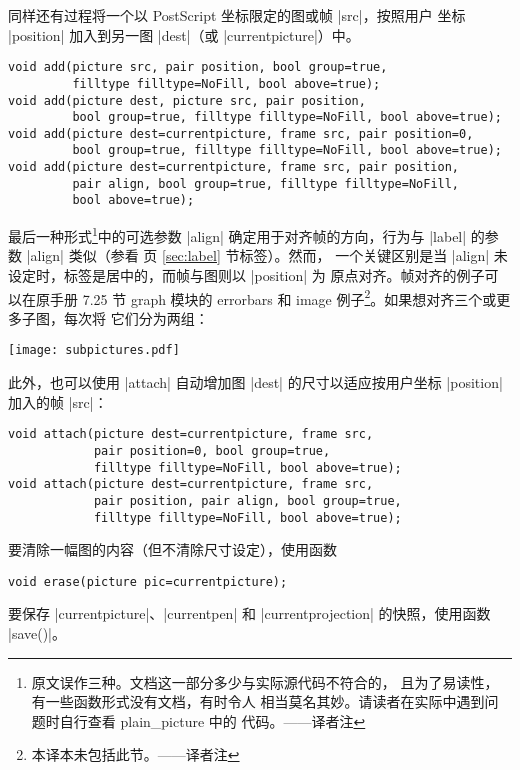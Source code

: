 \documentclass{ctexbook}
\makeatletter
\newenvironment{typelist}{\itemize
  \let\old@item\@item
  \def\@item[##1]{\expandafter\old@item[\ttfamily\color{type!50!black}##1]}}
{\enditemize}
\newcommand*\prgname[1]{\textsf{#1}}
\newcommand\transnote[1]{\footnote{#1——译者注}}
\makeatother
\begin{document}
\begin{typelist}
同样还有过程将一个以 \prgname{PostScript} 坐标限定的图或帧 |src|，按照用户
坐标 |position| 加入到另一图 |dest|（或 |currentpicture|）中。
\begin{lstlisting}
void add(picture src, pair position, bool group=true,
         filltype filltype=NoFill, bool above=true);
void add(picture dest, picture src, pair position,
         bool group=true, filltype filltype=NoFill, bool above=true);
void add(picture dest=currentpicture, frame src, pair position=0,
         bool group=true, filltype filltype=NoFill, bool above=true);
void add(picture dest=currentpicture, frame src, pair position,
         pair align, bool group=true, filltype filltype=NoFill,
         bool above=true);
\end{lstlisting}
最后一种形式\transnote{原文误作三种。文档这一部分多少与实际源代码不符合的，
且为了易读性，有一些函数形式没有文档，有时令人
相当莫名其妙。请读者在实际中遇到问题时自行查看 \prgname{plain\_picture} 中的
代码。}中的可选参数 |align| 确定用于对齐帧的方向，行为与 |label| 的参数
|align| 类似（参看 \pageref{sec:label} 页 \ref{sec:label} 节标签）。然而，
一个关键区别是当 |align| 未设定时，标签是居中的，而帧与图则以 |position| 为
原点对齐。帧对齐的例子可以在原手册 7.25 节 \prgname{graph} 模块的 errorbars
和 image 例子\transnote{本译本未包括此节。}。如果想对齐三个或更多子图，每次将
它们分为两组：

\begin{center}
  \texttt{[image: subpictures.pdf]}
\end{center}

此外，也可以使用 |attach| 自动增加图 |dest| 的尺寸以适应按用户坐标 |position|
加入的帧 |src|：
\begin{lstlisting}
void attach(picture dest=currentpicture, frame src,
            pair position=0, bool group=true,
            filltype filltype=NoFill, bool above=true);
void attach(picture dest=currentpicture, frame src,
            pair position, pair align, bool group=true,
            filltype filltype=NoFill, bool above=true);
\end{lstlisting}

要清除一幅图的内容（但不清除尺寸设定），使用函数
\begin{lstlisting}
void erase(picture pic=currentpicture);
\end{lstlisting}

要保存 |currentpicture|、|currentpen| 和 |currentprojection| 的快照，使用函数
|save()|。


\end{typelist}
\end{document}
